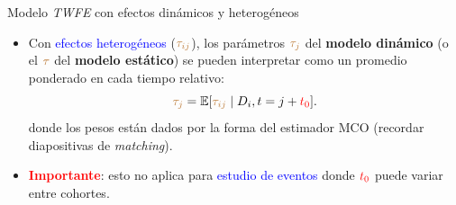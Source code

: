 \documentclass[10pt, xcolor=dvipsnames]{beamer}
\begin{document}
\begin{frame}{Modelo \textit{TWFE} con efectos dinámicos y heterogéneos}
    \begin{itemize}\setlength{\itemsep}{1.0em}
    \item[3.] Con \textcolor{blue}{efectos heterogéneos} (\(\textcolor{brown}{\tau_{ij}}\)), los parámetros \(\textcolor{brown}{\tau_{j}}\) del \textbf{modelo dinámico} (o el \(\textcolor{brown}{\tau}\) del \textbf{modelo estático}) se pueden interpretar como un promedio ponderado en cada tiempo relativo:
    \[
    \textcolor{brown}{\tau_j} = \operatorname{\mathbb{E}}[\textcolor{brown}{\tau_{ij}} \mid D_{i}, t= j + \textcolor{red}{t_0}].
    \]
    donde los pesos están dados por la forma del estimador MCO (recordar diapositivas de \textit{matching}). %
    \item \textcolor{red}{\textbf{Importante}}: esto no aplica para \textcolor{blue}{estudio de eventos} donde \(\textcolor{red}{t_0}\) puede variar entre cohortes.
    \end{itemize}   
\end{frame}

\end{document}
